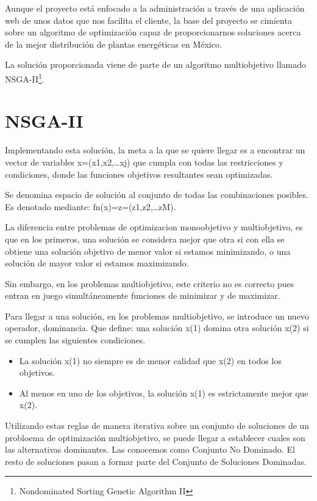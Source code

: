 
Aunque el proyecto está enfocado a la administración a través de una aplicación web de unos datos que nos facilita el cliente, la base del proyecto se cimienta sobre un algoritmo de optimización capaz de proporcionarnos soluciones acerca de la mejor distribución de plantas energéticas en México. 

La solución proporcionada viene de parte de un algoritmo multiobjetivo llamado NSGA-II\footnote{Nondominated Sorting Genetic Algorithm II}.

\section{NSGA-II}

Implementando esta solución, la meta a la que se quiere llegar es a encontrar un vector de variables x=(x1,x2,…xj) que cumpla con todas las restricciones y condiciones, donde las funciones objetivos resultantes sean optimizadas. \cite{pdf:algoritmo}

Se denomina espacio de solución al conjunto de todas las combinaciones posibles. Es denotado mediante: fn(x)=z=(z1,z2,…zM). 

La diferencia entre problemas de optimizacion monoobjetivo y multiobjetivo, es que en los primeros, una solución se considera mejor que otra si con ella se obtiene una solución objetivo de menor valor si estamos minimizando, o una solución de mayor valor si estamos maximizando.

Sin embargo, en los problemas multiobjetivo, este criterio no es correcto pues entran en juego simultáneamente funciones de minimizar y de maximizar.

Para llegar a una solución, en los problemas multiobjetivo, se introduce un nuevo operador, dominancia. Que define: una solución 
x(1) domina otra solución x(2) si se cumplen las siguientes condiciones. \cite{pdf:nsga-ii}

\begin{itemize}
	\item La solución x(1) no siempre es de menor calidad que x(2) en todos los objetivos.
	\item Al menos en uno de los objetivos, la solución x(1) es estrictamente mejor que x(2).
\end{itemize}

Utilizando estas reglas de manera iterativa sobre un conjunto de soluciones de un probloema de optimización multiobjetivo, se puede llegar a establecer cuales son las alternativas dominantes. Las conocemos como Conjunto No Dominado.
El resto de soluciones pasan a formar parte del Conjunto de Soluciones Dominadas. 

